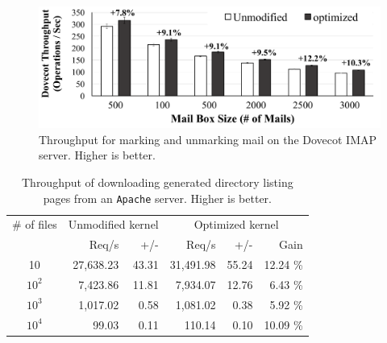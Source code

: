 \begin{figure}
\scriptsize
\centering
\includegraphics[width=5in]{dcache/plots/dovecot.pdf}
\vspace{-5pt}
\caption[Directory cache optimization: the Dovecot IMAP server throughput.]
{Throughput for marking and unmarking mail on the Dovecot IMAP server. Higher is better. }
\label{fig:dcache:dovecot}
\end{figure}

\begin{table}[t]
\footnotesize
\centering
\begin{tabular}{|c|rr|rrr|}
\hline
\# of files & \multicolumn{2}{c|}{Unmodified kernel} & \multicolumn{3}{c|}{Optimized kernel} \\
& Req/s & +/- & Req/s & +/- & Gain\\
\hline
    10 &     27,638.23 & 43.31 & 31,491.98 & 55.24 & 12.24 \% \\
\hline
$10^2$ &      7,423.86 & 11.81 &  7,934.07 & 12.76 &  6.43 \% \\
\hline
$10^3$ &      1,017.02 &  0.58 &  1,081.02 &  0.38 &  5.92 \% \\
\hline
$10^4$ &         99.03 &  0.11 &    110.14 &  0.10 & 10.09 \% \\
\hline
\end{tabular}
\caption[The optimized Apache server throughput.]
{Throughput of downloading generated directory listing pages from an {\tt Apache} server. Higher is better.}
\label{tab:dcache:apache}
\end{table}

